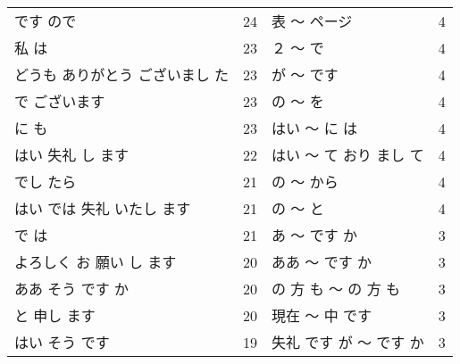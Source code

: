 \begin{table}[hbt]
\begin{center}
\begin{footnotesize}
\begin{tabular}{|lr||lr|}
です ので & 24 & 表 〜 ページ & 4\\
私 は & 23 & ２ 〜 で & 4\\
どうも ありがとう ございまし た & 23 & が 〜 です & 4\\
で ございます & 23 & の 〜 を & 4\\
に も & 23 & はい 〜 に は & 4\\
はい 失礼 し ます & 22 & はい 〜 て おり まし て & 4\\
でし たら & 21 & の 〜 から & 4\\
はい では 失礼 いたし ます & 21 & の 〜 と & 4\\
で は & 21 & あ 〜 です か & 3\\
よろしく お 願い し ます & 20 & ああ 〜 です か & 3\\
ああ そう です か & 20 & の 方 も 〜 の 方 も & 3\\
と 申し ます & 20 & 現在 〜 中 です & 3\\
はい そう です & 19 & 失礼 です が 〜 です か & 3\\
\hline
\end{tabular}
\end{footnotesize}
\end{center}
\end{table}

